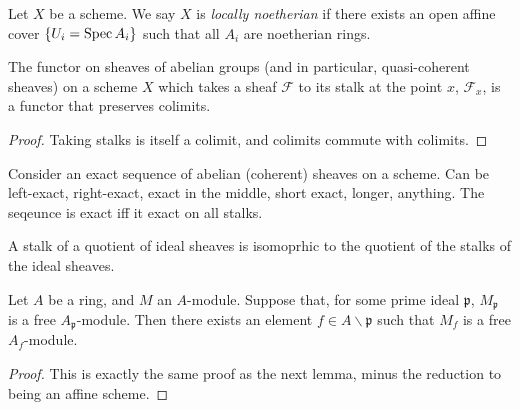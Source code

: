 \begin{definition}
	\label{def:noetherian_scheme}
	Let \(X\) be a scheme. 
	We say \(X\) is \textit{locally noetherian}
	if there exists an open affine cover
	\(\{U_{i} = \operatorname{Spec} A_{i}\}\) such that
	all \(A_{i}\) are noetherian rings.
\end{definition}

\begin{lemma}
  \label{lem:stalks_preserve_colimits}
  The functor on sheaves of abelian groups
  (and in particular, quasi-coherent sheaves)
  on a scheme $X$
  which takes a sheaf $\mathcal{F}$ to its
  stalk at the point $x$, $\mathcal{F}_x$,
  is a functor that preserves colimits.
\end{lemma}

\begin{proof}
  Taking stalks is itself a colimit, and
  colimits commute with colimits.
\end{proof}

\begin{theorem}
  \label{thm:stalk_exact_iff_sheaf_exact}
  Consider an exact sequence of abelian (coherent) sheaves
  on a scheme.
  Can be left-exact, right-exact, exact in the middle,
  short exact, longer, anything.
  The seqeunce is exact iff it exact on all stalks.
\end{theorem}

\begin{corollary}
  \label{cor:stalk_preserves_quotients}
  A stalk of a quotient of ideal sheaves
  is isomoprhic to the quotient of the stalks
  of the ideal sheaves.
\end{corollary}


\begin{lemma}
	\label{lem:affine_stalk_free_implies_locally_free}
	Let \(A\) be a ring, and \(M\) an \(A\)-module.
	Suppose that, for some prime ideal \(\mathfrak{p}\),
	\(M_{\mathfrak{p}}\) is a free
	\(A_{\mathfrak{p}}\)-module.
	Then there exists an element 
	\(f \in A \smallsetminus \mathfrak{p}\)
	such that 
	\(M_{f}\) is a free \(A_{f}\)-module.
\end{lemma}

\begin{proof}
	This is exactly the same proof
	as the next lemma, minus the reduction
	to being an affine scheme.
\end{proof}




